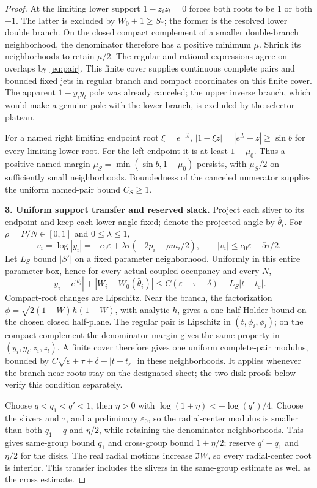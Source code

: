 \documentclass[11pt]{article}
\numberwithin{equation}{section}
\theoremstyle{definition}
\newcommand{\ii}{\mathrm i}
\newcommand{\eps}{\varepsilon}
\begin{document}
\begin{proof}
At the limiting lower support \(1-z_i z_l=0\) forces both
roots to be \(1\) or both \(-1\). The latter is excluded by
\(W_0+1\ge S_*\); the former is the resolved lower double branch.
On the closed compact complement of a smaller double-branch
neighborhood, the denominator therefore has a positive minimum
\(\mu\). Shrink its neighborhoods to retain \(\mu/2\).
The regular and rational expressions agree on overlaps by
\eqref{eq:pair}. This finite cover supplies continuous complete
pairs and bounded fixed jets in regular branch and compact
coordinates on this finite cover.
The apparent \(1-y_i y_l\) pole was already canceled; the upper
inverse branch, which would make a genuine pole with the lower
branch, is excluded by the selector plateau.

For a named right limiting endpoint root \(\xi=e^{-\ii b}\),
\(|1-\xi z|=|e^{\ii b}-z|\ge\sin b\) for every limiting lower
root. For the left endpoint it is at least \(1-\mu_0\).
Thus a positive named margin
\(\mu_S=\min(\sin b,1-\mu_0)\) persists, with \(\mu_S/2\)
on sufficiently small neighborhoods. Boundedness of the canceled
numerator supplies the uniform named-pair bound \(C_S\ge1\).

\par\smallskip\noindent\textbf{3. Uniform support transfer and reserved slack.}
Project each sliver to its endpoint and keep each lower angle
fixed; denote the projected angle by \(\bar\theta_i\).
For \(\rho=P/N\in[0,1]\) and \(0\le\lambda\le1\),
\[
 v_i=\log|y_i|=-c_0\eps+\lambda\tau(-2p_i+\rho m_i/2),
 \qquad |v_i|\le c_0\eps+5\tau/2.
\]
Let \(L_S\) bound \(|S'|\) on a fixed parameter neighborhood.
Uniformly in this entire parameter box, hence for every actual
coupled occupancy and every \(N\),
\[
 |y_i-e^{\ii\bar\theta_i}|+|W_i-W_0(\bar\theta_i)|
 \le C(\eps+\tau+\delta)+L_S|t-t_\eps|.
\]
Compact-root changes are Lipschitz. Near the branch, the factorization
\(\phi=\sqrt{2(1-W)}h(1-W)\), with analytic \(h\), gives a
one-half Holder bound on the chosen closed half-plane.
The regular pair is Lipschitz in \((t,\phi_i,\phi_l)\);
on the compact complement the denominator margin gives the same
property in \((y_i,y_l,z_i,z_l)\). A finite cover therefore gives
one uniform complete-pair modulus, bounded by
\(C\sqrt{\eps+\tau+\delta+|t-t_\eps|}\) in these neighborhoods.
It applies whenever the branch-near roots stay on the designated
sheet; the two disk proofs below verify this condition separately.

Choose \(q<q_1<q'<1\), then \(\eta>0\) with
\(\log(1+\eta)<-\log(q')/4\).
Choose the slivers and \(\tau\), and a preliminary \(\eps_0\),
so the radial-center modulus is smaller than both \(q_1-q\)
and \(\eta/2\), while retaining the denominator neighborhoods.
This gives same-group bound \(q_1\) and cross-group bound
\(1+\eta/2\); reserve \(q'-q_1\) and \(\eta/2\) for the disks.
The real radial motions increase \(\Im W\), so every radial-center
root is interior. This transfer includes the slivers in the
same-group estimate as well as the cross estimate.


\end{proof}
\end{document}
